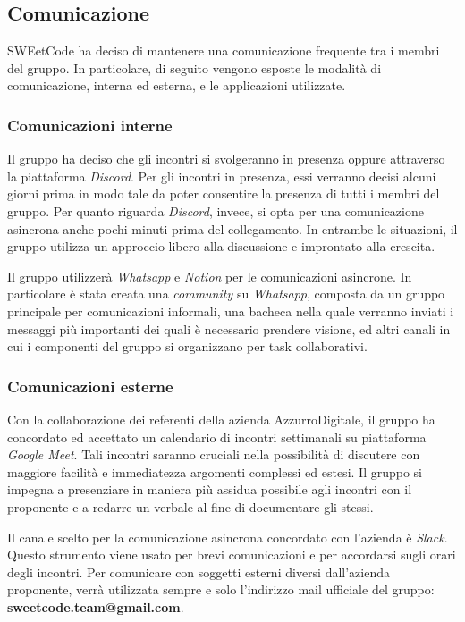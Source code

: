 \documentclass[10pt, a4paper]{article}
\begin{document}
\subsection{Comunicazione}
SWEetCode ha deciso di mantenere una comunicazione frequente tra i membri del gruppo. In particolare, di seguito vengono esposte le modalità di comunicazione, interna ed esterna, e le applicazioni utilizzate.

\subsubsection{Comunicazioni interne}

Il gruppo ha deciso che gli incontri si svolgeranno  in presenza oppure attraverso la piattaforma \textit{Discord}. Per gli incontri in presenza, essi verranno decisi alcuni giorni prima in modo tale da poter consentire la presenza di tutti i membri del gruppo. Per quanto riguarda \textit{Discord}, invece, si opta per una comunicazione asincrona anche pochi minuti prima del collegamento. In entrambe le situazioni, il gruppo utilizza un approccio libero alla discussione e improntato alla crescita.

Il gruppo utilizzerà \textit{Whatsapp} e \textit{Notion} per le comunicazioni asincrone. In particolare è stata creata una \textit{community} su \textit{Whatsapp}, composta da un gruppo principale per comunicazioni informali, una bacheca nella quale verranno inviati i messaggi più importanti dei quali è necessario prendere visione, ed altri canali in cui i componenti del gruppo si organizzano per task collaborativi.

\subsubsection{Comunicazioni esterne}

Con la collaborazione dei referenti della azienda AzzurroDigitale, il gruppo ha concordato ed accettato un calendario di incontri settimanali su piattaforma \textit{Google Meet}. Tali incontri saranno cruciali nella possibilità di discutere con maggiore facilità e immediatezza argomenti complessi ed estesi. Il gruppo si impegna a presenziare in maniera più assidua possibile agli incontri con il proponente e a redarre un verbale al fine di documentare gli stessi.

Il canale scelto per la comunicazione asincrona concordato con l'azienda è \textit{Slack}. Questo strumento viene usato per brevi comunicazioni e per accordarsi sugli orari degli incontri.
Per comunicare con soggetti esterni diversi dall'azienda proponente, verrà utilizzata sempre e solo l'indirizzo mail ufficiale del gruppo: \textbf{sweetcode.team@gmail.com}.
\end{document}
